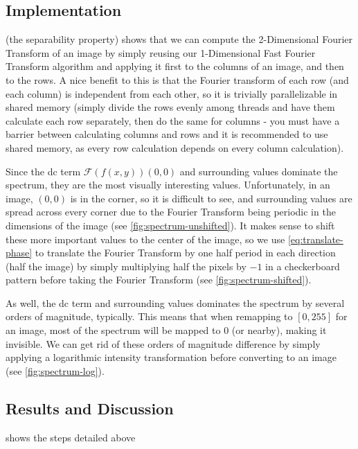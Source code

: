\documentclass[headings=optiontoheadandtoc,listof=totoc,parskip=full]{scrartcl}
\begin{document}
\subsection{Implementation}
 (the separability property) shows that we can compute the 2-Dimensional Fourier Transform of an image by simply reusing our 1-Dimensional Fast Fourier Transform algorithm and applying it first to the columns of an image, and then to the rows. A nice benefit to this is that the Fourier transform of each row (and each column) is independent from each other, so it is trivially parallelizable in shared memory (simply divide the rows evenly among threads and have them calculate each row separately, then do the same for columns - you must have a barrier between calculating columns and rows and it is recommended to use shared memory, as every row calculation depends on every column calculation).

Since the dc term $\mathcal{F}(f(x,y))(0,0)$ and surrounding values dominate the spectrum, they are the most visually interesting values. Unfortunately, in an image, $(0,0)$ is in the corner, so it is difficult to see, and surrounding values are spread across every corner due to the Fourier Transform being periodic in the dimensions of the image (see \cref{fig:spectrum-unshifted}). It makes sense to shift these more important values to the center of the image, so we use \cref{eq:translate-phase} to translate the Fourier Transform by one half period in each direction (half the image) by simply multiplying half the pixels by $-1$ in a checkerboard pattern before taking the Fourier Transform (see \cref{fig:spectrum-shifted}).

As well, the dc term and surrounding values dominates the spectrum by several orders of magnitude, typically. This means that when remapping to $[0, 255]$ for an image, most of the spectrum will be mapped to 0 (or nearby), making it invisible. We can get rid of these orders of magnitude difference by simply applying a logarithmic intensity transformation before converting to an image (see \cref{fig:spectrum-log}).

\subsection{Results and Discussion}

 shows the steps detailed above 
\end{document}
